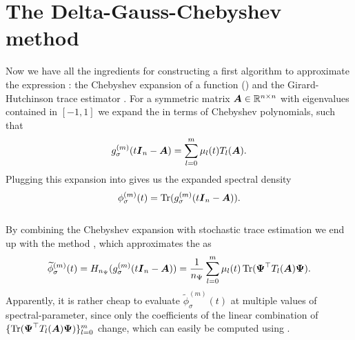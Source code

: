 
\section{The Delta-Gauss-Chebyshev method}
\label{sec:2-chebyshev-delta-gauss-chebyshev}

Now we have all the ingredients for constructing a first algorithm to approximate
the expression :
the Chebyshev expansion of a function ()
and the Girard-Hutchinson trace estimator .
For a symmetric matrix $\boldsymbol{A} \in \mathbb{R}^{n \times n}$ with eigenvalues
contained in $[-1, 1]$
we expand the  in terms of Chebyshev polynomials, such that
\begin{equation}
    g_{\sigma}^{(m)}(t\boldsymbol{I}_n - \boldsymbol{A}) = \sum_{l=0}^{m} \mu_l(t) T_l(\boldsymbol{A}).
    \label{equ:2-chebyshev-chebyshev-expansion}
\end{equation}
Plugging this expansion into 
gives us the expanded spectral density
\begin{equation}
    \phi_{\sigma}^{(m)}(t) = \operatorname{Tr}(g_{\sigma}^{(m)}(t\boldsymbol{I}_n - \boldsymbol{A})).
    \label{equ:2-chebyshev-spectral-density-as-trace-expansion}
\end{equation}\\

By combining the Chebyshev expansion 
with stochastic trace estimation
we end up with the  method \cite[algorithm~2]{lin2017randomized},
which approximates the  as
\begin{equation}
    \widetilde{\phi}_{\sigma}^{(m)}(t) = H_{n_{\Psi}}(g_{\sigma}^{(m)}(t\boldsymbol{I}_n - \boldsymbol{A})) = \frac{1}{n_{\Psi}} \sum_{l=0}^m \mu_l(t) \operatorname{Tr}(\boldsymbol{\Psi}^{\top} T_l(\boldsymbol{A}) \boldsymbol{\Psi}).
    \label{equ:2-chebyshev-DGC-final-estimator}
\end{equation}
Apparently, it is rather cheap to evaluate $\widetilde{\phi}_{\sigma}^{(m)}(t)$
at multiple values of \gls{spectral-parameter}, since only the coefficients
of the linear combination of $\{\operatorname{Tr}(\boldsymbol{\Psi}^{\top} T_l(\boldsymbol{A}) \boldsymbol{\Psi})\}_{l=0}^m$
change, which can easily be computed using .\\

